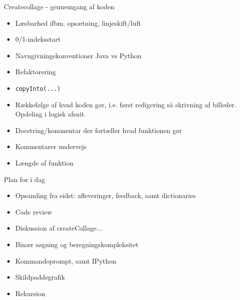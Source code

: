 \documentclass[a4paper,landscape]{slides}
\begin{document}
\begin{slide}
	\begin{center} {\large 
            Createcollage - gennemgang af koden
	} \end{center}
	\begin{itemize} \addtolength{\itemsep}{-\baselineskip}
                \item Læsbarhed ifbm. opsætning, linjeskift/luft
                \item 0/1-indeksstart
                \item Navngivningskonventioner Java vs Python
                \item Refaktorering
                \item \verb|copyInto(...)|
                \item Rækkefølge af hvad koden gør, i.e. først redigering så skrivning af billeder. Opdeling i logisk afsnit
                \item Docstring/kommentar der fortæller hvad funktionen gør
                \item Kommentarer undervejs
                \item Længde af funktion
	\end{itemize}
\end{slide}

\begin{slide}
	\begin{center} {\large 
            Plan for i dag
	} \end{center}
	\begin{itemize} \addtolength{\itemsep}{-\baselineskip}
		\item Opsamling fra sidst: afleveringer, feedback, samt dictionaries
                \item Code review
		\item Diskussion af createCollage...
                \item Binær søgning og beregningskompleksitet
		\item Kommandoprompt, samt IPython
		\item Skildpaddegrafik 
                \item Rekursion
	\end{itemize}
\end{slide}
\end{document}
